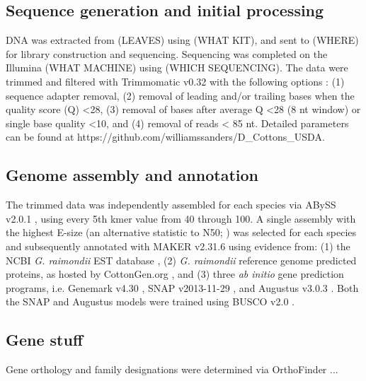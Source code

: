 \documentclass{bmcart}
\newcommand{\note}[2][]{\added[id=#1,remark={#2}]{}}
\begin{document}
\subsection*{Sequence generation and initial processing}
DNA was extracted from (LEAVES) using (WHAT KIT), and sent to (WHERE) for library construction and sequencing.  Sequencing was completed on the Illumina (WHAT MACHINE) using (WHICH SEQUENCING). The data were trimmed and filtered with Trimmomatic v0.32 \note[Corrinne]{citation} with the following options : (1) sequence adapter removal, (2) removal of leading and/or trailing bases when the quality score (Q) <28, (3) removal of bases after average Q <28 (8 nt window) or single base quality <10, and (4) removal of reads < 85 nt. Detailed parameters can be found at https://github.com/williamssanders/D\_Cottons\_USDA. \note[Corrinne]{Let's port this repo to a lab site after and give the new url}

\subsection*{Genome assembly and annotation}
The trimmed data was independently assembled for each species via ABySS v2.0.1 \note[Corrinne]{citation}, using every 5th kmer value from 40 through 100. A single assembly with the highest E-size  (an alternative statistic to N50; \note[Corrinne]{citation Salzberg 2011}) was selected for each species and subsequently annotated with MAKER v2.31.6 \note[Corrinne]{citation} using evidence from: (1) the NCBI \textit{G. raimondii} EST database \note[Corrinne]{citation}, (2) \textit{G. raimondii} reference genome predicted proteins, as hosted by CottonGen.org \note[Corrinne]{citation}, and (3) three \textit{ab initio} gene prediction programs, i.e. Genemark v4.30 \note[Corrinne]{citation}, SNAP v2013-11-29 \note[Corrinne]{citation}, and Augustus v3.0.3 \note[Corrinne]{citation}. Both the SNAP and Augustus models were trained using BUSCO v2.0 \note[Corrinne]{citation}.    

\subsection*{Gene stuff}
Gene orthology and family designations were determined via OrthoFinder \note[Corrinne]{citation}...
\end{document}
